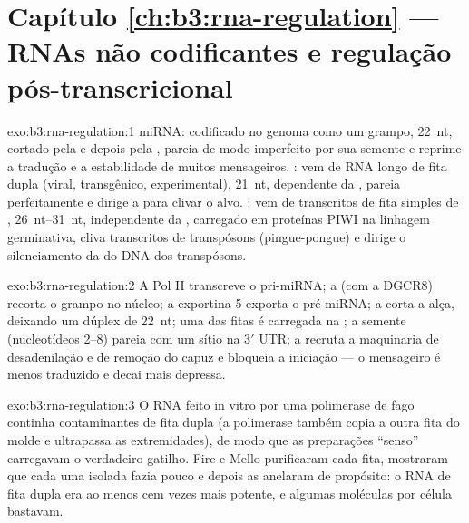 \section*{Capítulo \ref{ch:b3:rna-regulation} --- RNAs não codificantes e regulação pós-transcricional}

\begin{solution}{exo:b3:rna-regulation:1}
miRNA: codificado no genoma como um grampo, \qty{22}{nt}, cortado pela
 e depois pela , pareia de modo imperfeito por sua semente e
reprime a tradução e a estabilidade de muitos mensageiros. : vem
de RNA longo de fita dupla (viral, transgênico, experimental),
\qty{21}{nt}, dependente da , pareia perfeitamente e dirige a
 para clivar o alvo. : vem de transcritos de fita simples
de , \qtyrange{26}{31}{nt}, independente da ,
carregado em proteínas PIWI na linhagem germinativa, cliva transcritos
de transpósons (pingue-pongue) e dirige o silenciamento da  do
DNA dos transpósons.
\end{solution}

\begin{solution}{exo:b3:rna-regulation:2}
A Pol II transcreve o pri-miRNA; a  (com a DGCR8) recorta o
grampo no núcleo; a exportina-5 exporta o pré-miRNA; a  corta a
alça, deixando um dúplex de \qty{22}{nt}; uma das fitas é carregada na
; a semente (nucleotídeos 2--8) pareia com um sítio na 3$'$
UTR; a  recruta a maquinaria de desadenilação e de remoção do
capuz e bloqueia a iniciação --- o mensageiro é menos traduzido e decai
mais depressa.
\end{solution}

\begin{solution}{exo:b3:rna-regulation:3}
O RNA feito in vitro por uma polimerase de fago continha contaminantes
de fita dupla (a polimerase também copia a outra fita do molde e
ultrapassa as extremidades), de modo que as preparações ``senso''
carregavam o verdadeiro gatilho. Fire e Mello purificaram cada fita,
mostraram que cada uma isolada fazia pouco e depois as anelaram de
propósito: o RNA de fita dupla era ao menos cem vezes mais potente, e
algumas moléculas por célula bastavam.
\end{solution}

